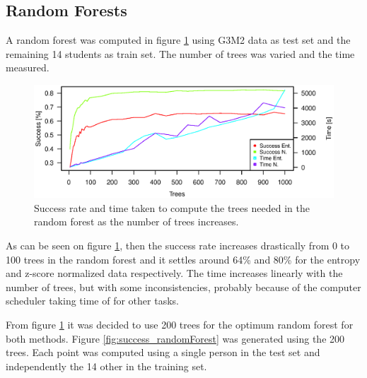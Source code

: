 \subsection{Random Forests}

A random forest was computed in figure \ref{fig:success_time_vs_trees_randomForest} using G3M2 data as test set and the remaining 14 students as train set.
The number of trees was varied and the time measured.

\begin{figure}[H]
\centering
\includegraphics[width = 0.95 \textwidth]{graphics/successRate_randomForest}
\caption{Success rate and time taken to compute the trees needed in the random forest as the number of trees increases.}
\label{fig:success_time_vs_trees_randomForest}
\end{figure}

As can be seen on figure \ref{fig:success_time_vs_trees_randomForest}, then the success rate increases drastically from 0 to 100 trees in the random forest and it settles around 64\% and 80\% for the entropy and z-score normalized data respectively.
The time increases linearly with the number of trees, but with some inconsistencies, probably because of the computer scheduler taking time of for other tasks.

From figure \ref{fig:success_time_vs_trees_randomForest} it was decided to use 200 trees for the optimum random forest for both methods.
Figure \ref{fig:success_randomForest} was generated using the 200 trees.
Each point was computed using a single person in the test set and independently the 14 other in the training set.

